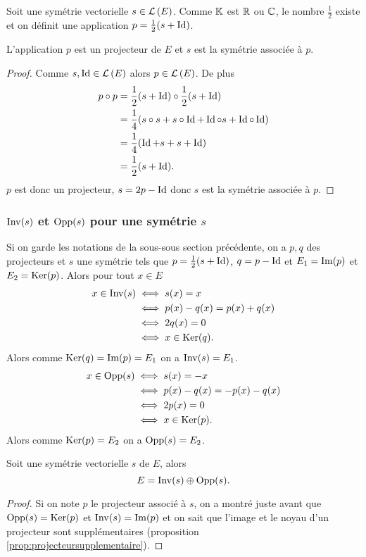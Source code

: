 Soit une symétrie vectorielle \(s \in \mathcal{L}\left(E\right)\). Comme \(\mathbb{K}\) est \(\mathbb{R}\) ou 
\(\mathbb{C}\), le nombre \(\frac{1}{2}\) existe et on définit une application \(p = 
\frac{1}{2}(s+\operatorname{Id})\).

\begin{prop}
  L'application \(p\) est un projecteur de \(E\) et \(s\) est la symétrie 
  associée à \(p\).
\end{prop}
\begin{proof}
  Comme \(s, \operatorname{Id} \in \mathcal{L}\left(E\right)\) alors \(p \in \mathcal{L}\left(E\right)\). De plus
  \begin{align}
    p \circ p &= \frac{1}{2}(s+\operatorname{Id}) \circ \frac{1}{2}(s+\operatorname{Id}) \\
    &=\frac{1}{4}(s \circ s + s\circ \operatorname{Id} +\operatorname{Id} \circ s +\operatorname{Id} \circ \operatorname{Id})\\
    &=\frac{1}{4}(\operatorname{Id} +s +s+\operatorname{Id})\\
    &=\frac{1}{2}(s+\operatorname{Id}).
  \end{align}
  \(p\) est donc un projecteur, \(s=2p-\operatorname{Id}\) donc \(s\) est la symétrie associée 
  à \(p\).
\end{proof}

\subsubsection{\(\operatorname{Inv}(s)\) et \(\operatorname{Opp}(s)\) pour une symétrie \(s\)}

Si on garde les notations de la sous-sous section précédente, on a \(p,q\) des 
projecteurs et \(s\) une symétrie tels que \(p=\frac{1}{2}(s+\operatorname{Id})\), \(q=p-\operatorname{Id}\) 
et \(E_1=\operatorname{Im}(p)\) et \(E_2=\operatorname{Ker}(p)\). Alors pour tout \(x \in E\)
\begin{align}
  x \in \operatorname{Inv}(s) &\iff s(x)=x \\
  &\iff p(x)-q(x)=p(x)+q(x) \\
  &\iff 2q(x)=0\\
  &\iff x \in \operatorname{Ker}(q).
\end{align}
Alors comme \(\operatorname{Ker}(q)=\operatorname{Im}(p)=E_1\) on a \(\operatorname{Inv}(s)=E_1\).
\begin{align}
  x \in \operatorname{Opp}(s) &\iff s(x)=-x \\
  &\iff p(x)-q(x)=-p(x)-q(x) \\
  &\iff 2p(x)=0\\
  &\iff x \in \operatorname{Ker}(p).
\end{align}
Alors comme \(\operatorname{Ker}(p)=E_2\) on a \(\operatorname{Opp}(s)=E_2\).
%
\begin{prop}
  Soit une symétrie vectorielle \(s\) de \(E\), alors
  \begin{equation}
    E=\operatorname{Inv}(s) \oplus \operatorname{Opp}(s).
  \end{equation}
\end{prop}
\begin{proof}
  Si on note \(p\) le projecteur associé à \(s\), on a montré juste avant que 
  \(\operatorname{Opp}(s)=\operatorname{Ker}(p)\) et \(\operatorname{Inv}(s)=\operatorname{Im}(p)\) et on sait que l'image et le 
  noyau d'un projecteur sont supplémentaires (proposition~
  \ref{prop:projecteursupplementaire}).
\end{proof}

